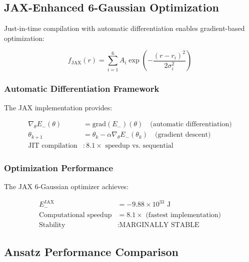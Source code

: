 \documentclass[12pt,a4paper]{article}
\begin{document}
\subsection{JAX-Enhanced 6-Gaussian Optimization}

Just-in-time compilation with automatic differentiation enables gradient-based optimization:

\begin{equation}
f_{\text{JAX}}(r) = \sum_{i=1}^{6} A_i \exp\left(-\frac{(r - r_i)^2}{2\sigma_i^2}\right)
\end{equation}

\subsubsection{Automatic Differentiation Framework}

The JAX implementation provides:

\begin{align}
\nabla_{\theta} E_-(\theta) &= \text{grad}(E_-)(\theta) \quad \text{(automatic differentiation)} \\
\theta_{k+1} &= \theta_k - \alpha \nabla_{\theta} E_-(\theta_k) \quad \text{(gradient descent)} \\
\text{JIT compilation} &: 8.1 \times \text{ speedup vs. sequential}
\end{align}

\subsubsection{Optimization Performance}

The JAX 6-Gaussian optimizer achieves:

\begin{align}
E_{-}^{\text{JAX}} &= -9.88 \times 10^{33} \text{ J} \\
\text{Computational speedup} &= 8.1 \times \text{ (fastest implementation)} \\
\text{Stability} &: \text{MARGINALLY STABLE}
\end{align}

\subsection{Ansatz Performance Comparison}
\end{document}
